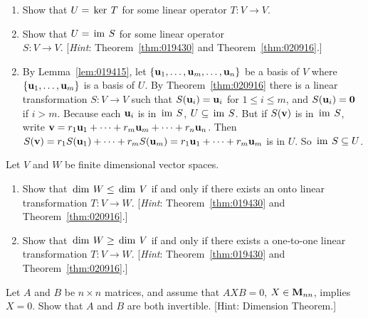 \begin{multicols}{2}
\begin{ex}
\begin{enumerate}[label={\alph*.}]
\item Show that $U = \thinspace\operatorname{ker \medspace}T$ for some linear operator $T : V \to V$.

\item Show that $U = \thinspace\operatorname{im \medspace}S$ for some linear operator \\$S : V \to V$. [\textit{Hint}: Theorem~\ref{thm:019430} and Theorem~\ref{thm:020916}.]

\end{enumerate}
\begin{sol}
\begin{enumerate}[label={\alph*.}]
\setcounter{enumi}{1}
\item  By Lemma~\ref{lem:019415}, let $\{\textbf{u}_{1}, \dots, \textbf{u}_{m}, \dots,  \textbf{u}_{n}\}$ be a basis of $V$ where $\{\textbf{u}_{1}, \dots, \textbf{u}_{m}\}$ is a basis of $U$. By Theorem~\ref{thm:020916} there is a linear transformation $S : V \to V$ such that $S(\textbf{u}_{i}) = \textbf{u}_{i}$ for $1 \leq i \leq m$, and $S(\textbf{u}_{i}) = \textbf{0}$ if $i > m$. Because each $\textbf{u}_{i}$ is in $\thinspace\operatorname{im \medspace}S$, $U \subseteq \thinspace\operatorname{im \medspace}S$. But if $S(\textbf{v})$ is in $\thinspace\operatorname{im \medspace}S$, write $\textbf{v} = r_{1}\textbf{u}_{1} + \cdots + r_{m}\textbf{u}_{m} + \cdots + r_{n}\textbf{u}_{n}$. Then $S(\textbf{v}) = r_{1}S(\textbf{u}_{1}) + \cdots + r_{m}S(\textbf{u}_{m}) = r_{1}\textbf{u}_{1} + \cdots + r_{m}\textbf{u}_{m}$ is in $U$. So $\thinspace\operatorname{im \medspace}S \subseteq U$.

\end{enumerate}
\end{sol}
\end{ex}

\begin{ex}
Let $V$ and $W$ be finite dimensional vector spaces.


\begin{enumerate}[label={\alph*.}]
\item Show that $\thinspace\operatorname{dim \medspace}W \leq \thinspace\operatorname{dim \medspace}V$ if and only if there exists an onto linear transformation $T : V \to W$. [\textit{Hint}: Theorem~\ref{thm:019430} and Theorem~\ref{thm:020916}.]

\item Show that $\thinspace\operatorname{dim \medspace}W \geq \thinspace\operatorname{dim \medspace}V$ if and only if there exists a one-to-one linear transformation $T : V \to W$. [\textit{Hint}: Theorem~\ref{thm:019430} and Theorem~\ref{thm:020916}.]

\end{enumerate}
\end{ex}

\begin{ex}
Let $A$ and $B$ be $n \times n$ matrices, and assume that $AXB=0$, $X \in \textbf{M}_{nn}$, implies $X=0$. Show that $A$ and $B$ are both invertible. [Hint: Dimension Theorem.] 
\end{ex}
\end{multicols}
